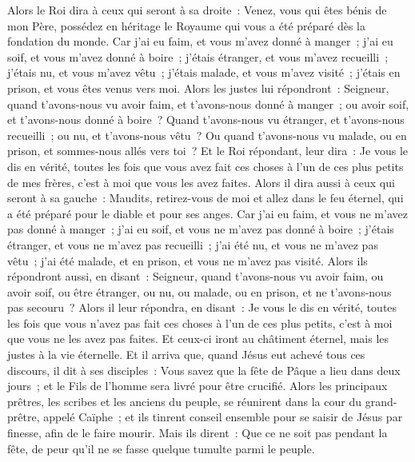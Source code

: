 \begin{multicols}{2}
Alors le Roi dira à ceux qui seront à sa droite~: Venez, vous qui êtes bénis de mon Père, possédez en héritage le Royaume qui vous a été préparé dès la fondation du monde.
Car j'ai eu faim, et vous m'avez donné à manger~; j'ai eu soif, et vous m'avez donné à boire~; j'étais étranger, et vous m'avez recueilli~;
j'étais nu, et vous m'avez vêtu~; j'étais malade, et vous m'avez visité~; j'étais en prison, et vous êtes venus vers moi.
Alors les justes lui répondront~: Seigneur, quand t'avons-nous vu avoir faim, et t'avons-nous donné à manger~; ou avoir soif, et t'avons-nous donné à boire~?
Quand t'avons-nous vu étranger, et t'avons-nous recueilli~; ou nu, et t'avons-nous vêtu~?
Ou quand t'avons-nous vu malade, ou en prison, et sommes-nous allés vers toi~?
Et le Roi répondant, leur dira~: Je vous le dis en vérité, toutes les fois que vous avez fait ces choses à l'un de ces plus petits de mes frères, c'est à moi que vous les avez faites.
Alors il dira aussi à ceux qui seront à sa gauche~: Maudits, retirez-vous de moi et allez dans le feu éternel, qui a été préparé pour le diable et pour ses anges.
Car j'ai eu faim, et vous ne m'avez pas donné à manger~; j'ai eu soif, et vous ne m'avez pas donné à boire~;
j'étais étranger, et vous ne m'avez pas recueilli~; j'ai été nu, et vous ne m'avez pas vêtu~; j'ai été malade, et en prison, et vous ne m'avez pas visité.
Alors ils répondront aussi, en disant~: Seigneur, quand t'avons-nous vu avoir faim, ou avoir soif, ou être étranger, ou nu, ou malade, ou en prison, et ne t'avons-nous pas secouru~?
Alors il leur répondra, en disant~: Je vous le dis en vérité, toutes les fois que vous n'avez pas fait ces choses à l'un de ces plus petits, c'est à moi que vous ne les avez pas faites.
Et ceux-ci iront au châtiment éternel, mais les justes à la vie éternelle.
\VerseOne{}Et il arriva que, quand Jésus eut achevé tous ces discours, il dit à ses disciples~:
Vous savez que la fête de Pâque a lieu dans deux jours~; et le Fils de l'homme sera livré pour être crucifié.
Alors les principaux prêtres, les scribes et les anciens du peuple, se réunirent dans la cour du grand-prêtre, appelé Caïphe~;
et ils tinrent conseil ensemble pour se saisir de Jésus par finesse, afin de le faire mourir.
Mais ils dirent~: Que ce ne soit pas pendant la fête, de peur qu'il ne se fasse quelque tumulte parmi le peuple.

\end{multicols}
